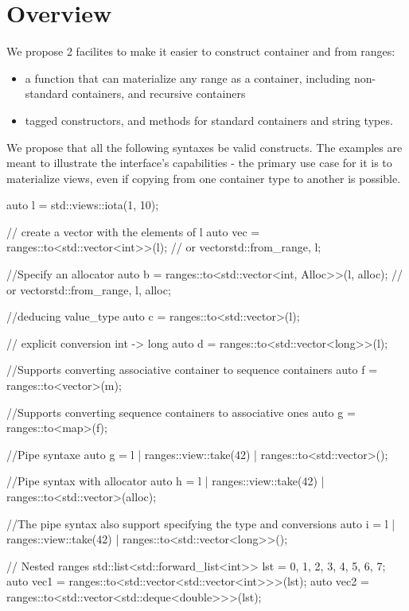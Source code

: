 \documentclass{wg21}
\begin{document}
\section{Overview}

We propose 2 facilites to make it easier to construct container and from ranges:

\begin{itemize}
\item {} a function that can materialize any range as a container, including non-standard containers, and recursive containers
\item tagged constructors,  and  methods for standard containers and string types.
\end{itemize}


We propose that all the following syntaxes be valid constructs.
The examples are meant to illustrate the interface's capabilities - the primary use case for it is to materialize views, even if copying from one container type to another is possible.

\begin{colorblock}
auto l = std::views::iota(1, 10);

// create a vector with the elements of l
auto vec = ranges::to<std::vector<int>>(l); // or vector{std::from_range, l};

//Specify an allocator
auto b = ranges::to<std::vector<int, Alloc>>(l, alloc); // or vector{std::from_range, l, alloc};

//deducing value_type
auto c = ranges::to<std::vector>(l);

// explicit conversion int -> long
auto d = ranges::to<std::vector<long>>(l);


//Supports converting associative container to sequence containers
auto f = ranges::to<vector>(m);

//Supports converting sequence containers to associative ones
auto g = ranges::to<map>(f);

//Pipe syntaxe
auto g = l | ranges::view::take(42) | ranges::to<std::vector>();

//Pipe syntax with allocator
auto h = l | ranges::view::take(42) | ranges::to<std::vector>(alloc);

//The pipe syntax also support specifying the type and conversions
auto i = l | ranges::view::take(42) | ranges::to<std::vector<long>>();

// Nested ranges
std::list<std::forward_list<int>> lst = {{0, 1, 2, 3}, {4, 5, 6, 7}};
auto vec1 = ranges::to<std::vector<std::vector<int>>>(lst);
auto vec2 = ranges::to<std::vector<std::deque<double>>>(lst);

\end{colorblock}
\end{document}

